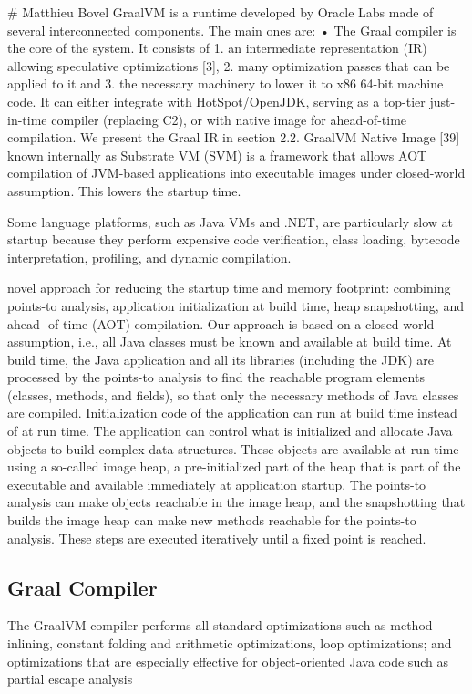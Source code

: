 # Matthieu Bovel
GraalVM is a runtime developed by Oracle Labs made of several interconnected components. The main ones are:
• The Graal compiler is the core of the system. It consists of 1. an intermediate representation (IR) allowing
speculative optimizations [3], 2. many optimization passes that can be applied to it and 3. the necessary
machinery to lower it to x86 64-bit machine code. It can either integrate with HotSpot/OpenJDK, serving
as a top-tier just-in-time compiler (replacing C2), or with native image for ahead-of-time compilation. We
present the Graal IR in section 2.2.
GraalVM Native Image [39] known internally as Substrate VM (SVM) is a framework that allows AOT
compilation of JVM-based applications into executable images under closed-world assumption. This lowers
the startup time.

\cite{wimmer_initialize_2019}
 Some language platforms, such as Java VMs and .NET, are particularly slow at
startup because they perform expensive code verification, class loading, bytecode interpretation,
profiling, and dynamic compilation.

novel approach for reducing the startup time and memory footprint:
combining points-to analysis, application initialization at build time, heap snapshotting, and ahead-
of-time (AOT) compilation. 
Our approach is based on a closed-world assumption, i.e., all Java classes must be
known and available at build time. At build time, the Java application and all its libraries (including
the JDK) are processed by the points-to analysis to find the reachable program elements (classes,
methods, and fields), so that only the necessary methods of Java classes are compiled.
Initialization code of the application can run at build time instead of at run time. The application
can control what is initialized and allocate Java objects to build complex data structures. These
objects are available at run time using a so-called image heap, a pre-initialized part of the heap that
is part of the executable and available immediately at application startup. The points-to analysis
can make objects reachable in the image heap, and the snapshotting that builds the image heap can
make new methods reachable for the points-to analysis. These steps are executed iteratively until a
fixed point is reached.

\subsection{Graal Compiler}
\cite{wimmer_initialize_2019}
The GraalVM compiler performs all standard optimizations such as method inlining, constant
folding and arithmetic optimizations, loop optimizations; and optimizations that are especially
effective for object-oriented Java code such as partial escape analysis
